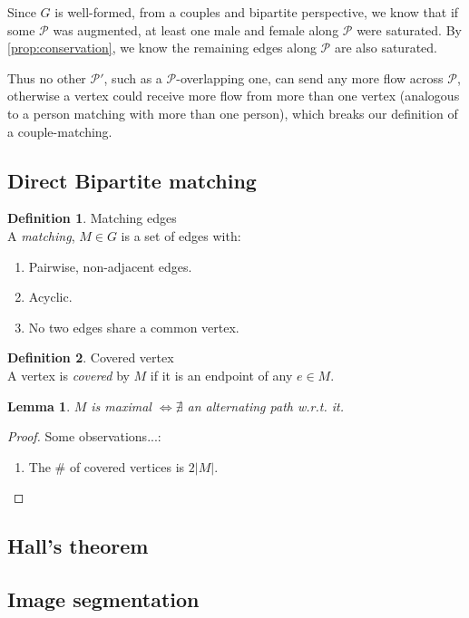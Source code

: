 \documentclass{article}
\newtheorem{lemma}[theorem]{Lemma}
\theoremstyle{definition}
\newtheorem{definition}{Definition}[section]
\begin{document}
Since $G$ is well-formed, from a couples and bipartite perspective, we know that if some $\mathcal{P}$ was augmented, at least one male and female along $\mathcal{P}$ were saturated. By \ref{prop:conservation}, we know the remaining edges along $\mathcal{P}$ are also saturated. 

Thus no other $\mathcal{P'}$, such as a $\mathcal{P}$-overlapping one, can send any more flow across $\mathcal{P}$, otherwise a vertex could receive more flow from more than one vertex (analogous to a person matching with more than one person), which breaks our definition of a couple-matching.

\subsection{Direct Bipartite matching}
\begin{definition}{Matching edges}
\label{def:match_edge}
	\\A \textit{matching}, $M \in G$ is a set of edges with:
	\begin{enumerate}
		\item Pairwise, non-adjacent edges.
		\item Acyclic.
		\item No two edges share a common vertex.
	\end{enumerate}
\end{definition}

\begin{definition}{Covered vertex}
	\label{def:covered_vtx}
	\\A vertex is \textit{covered} by $M$ if it is an endpoint of any $e \in M$.
\end{definition}

\begin{lemma}
	$M$ is maximal $\iff \nexists$ an alternating path w.r.t. it.
\end{lemma}

\begin{proof}	
	Some observations...:
	\begin{enumerate}
		\item The \# of covered vertices is $2|M|$.
	\end{enumerate}
\end{proof}

\subsection{Hall's theorem}

\subsection{Image segmentation}
\end{document}
